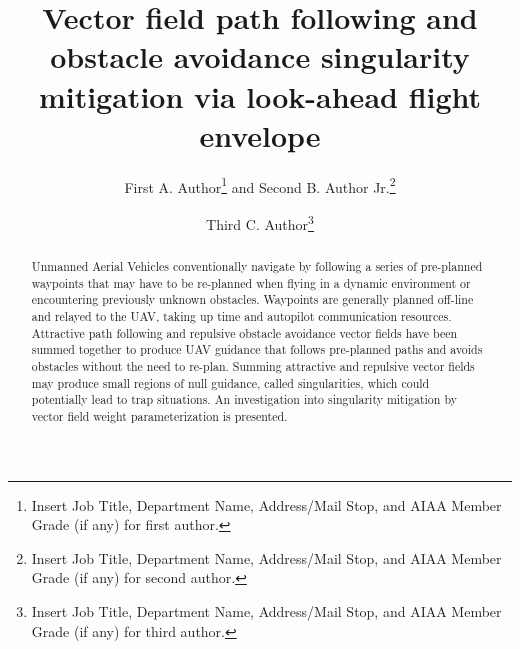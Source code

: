 \documentclass[conf]{new-aiaa}
\title{Vector field  path following and obstacle avoidance singularity mitigation via look-ahead flight envelope}
\author{First A. Author\footnote{Insert Job Title, Department Name, Address/Mail Stop, and AIAA Member Grade (if any) for first author.} and Second B. Author Jr.\footnote{Insert Job Title, Department Name, Address/Mail Stop, and AIAA Member Grade (if any) for second author.}}
\affil{Business or Academic Affiliation 1, City, State, Zip Code}
\author{Third C. Author\footnote{Insert Job Title, Department Name, Address/Mail Stop, and AIAA Member Grade (if any) for third author.}}
\begin{document}
\maketitle

\begin{abstract}

Unmanned Aerial Vehicles conventionally navigate by following a series of pre-planned waypoints that may have to be re-planned when flying in a dynamic environment or encountering previously unknown obstacles. Waypoints are generally planned off-line and relayed to the UAV, taking up time and autopilot communication resources. Attractive path following and repulsive obstacle avoidance vector fields have been summed together to produce UAV guidance that follows pre-planned paths and avoids obstacles without the need to re-plan. Summing attractive and repulsive vector fields may produce small regions of null guidance, called singularities, which could potentially lead to trap situations. An investigation into singularity mitigation by vector field weight parameterization is presented. 

%
%
\end{abstract}
\end{document}
